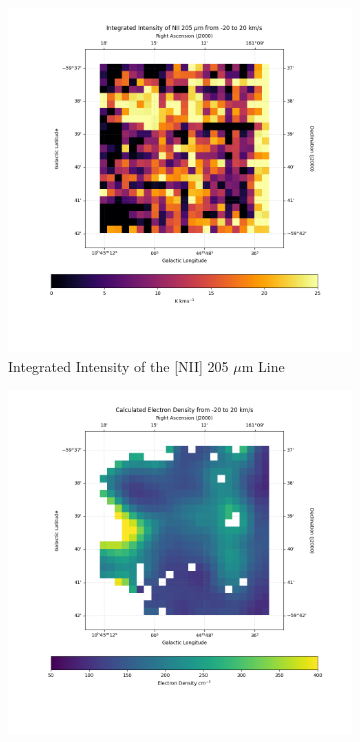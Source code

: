 \begin{figure}
\begin{subfigure}[t]{0.45\textwidth}
        \includegraphics[width=\textwidth]{figs/carina/carina/205.png}
        \caption{Integrated Intensity of the [NII] 205 $\mu$m Line}
    \end{subfigure}
    \begin{subfigure}[t]{0.45\textwidth}
        \centering
        \includegraphics[width=\textwidth]{figs/carina/carina/ne.png}

\end{subfigure}
\end{figure}
